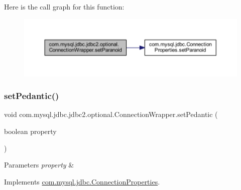 Here is the call graph for this function\+:
\nopagebreak
\begin{figure}[H]
\begin{center}
\leavevmode
\includegraphics[width=350pt]{classcom_1_1mysql_1_1jdbc_1_1jdbc2_1_1optional_1_1_connection_wrapper_a246bc6ed913e7b8cf4950a88744c3d04_cgraph}
\end{center}
\end{figure}
\mbox{\label{classcom_1_1mysql_1_1jdbc_1_1jdbc2_1_1optional_1_1_connection_wrapper_a1c2af9306775ec3517e4aee8de864380}} 
\subsubsection{\texorpdfstring{set\+Pedantic()}{setPedantic()}}
{\footnotesize\ttfamily void com.\+mysql.\+jdbc.\+jdbc2.\+optional.\+Connection\+Wrapper.\+set\+Pedantic (\begin{DoxyParamCaption}\item[{boolean}]{property }\end{DoxyParamCaption})}


\begin{DoxyParams}{Parameters}
{\em property} & \\
\hline
\end{DoxyParams}


Implements \mbox{\hyperlink{interfacecom_1_1mysql_1_1jdbc_1_1_connection_properties_acc7191665477c54523bc25845278b99f}{com.\+mysql.\+jdbc.\+Connection\+Properties}}.

